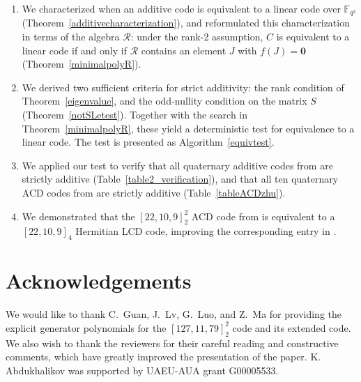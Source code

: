 \documentclass[a4paper,12pt]{article}
\theoremstyle{plain}
\theoremstyle{definition}
\begin{document}
\begin{enumerate}

\item We characterized when an additive code is equivalent to a linear code over $\mathbb{F}_{q^2}$ (Theorem~\ref{additivecharacterization}), and reformulated this characterization in terms of the algebra $\mathcal{R}$: under the rank-2 assumption, $C$ is equivalent to a linear code if and only if $\mathcal{R}$ contains an element $J$ with $f(J) = \mathbf{0}$ (Theorem~\ref{minimalpolyR}).

\item We derived two  sufficient criteria for strict additivity: the rank condition of Theorem~\ref{eigenvalue}, and the odd-nullity condition on the matrix $S$ (Theorem~\ref{notSLetest}). Together with the search in Theorem~\ref{minimalpolyR}, these yield a deterministic test for equivalence to a linear code. The test is presented as Algorithm~\ref{equivtest}.


\item We applied our test to verify that all quaternary additive codes from \cite[Table~II]{guan2023} are strictly additive (Table~\ref{table2_verification}), and that all ten quaternary ACD codes from \cite[Table~2]{zhu2024} are strictly additive (Table~\ref{tableACDzhu}).

\item We demonstrated that the $[22, 10, 9]^2_2$ ACD code from \cite[Table~IV]{guan2023} is equivalent to a $[22, 10, 9]_4$ Hermitian LCD code, improving the corresponding entry in \cite[Table~6]{araya2024}.
\end{enumerate}
 


\section*{Acknowledgements}
We would like to thank C.\ Guan, J.\ Lv, G.\ Luo, and Z.\ Ma for providing the explicit generator polynomials for the $[127, 11, 79]^2_2$ code and its extended code. 
We also wish to thank the reviewers for their careful reading and constructive comments, which have greatly improved the presentation of the paper.
K. Abdukhalikov was supported by UAEU-AUA grant G00005533.
\end{document}

